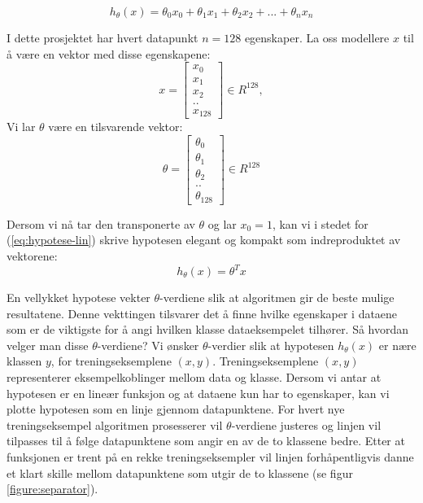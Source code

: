 \begin{equation}
h_\theta(x) = \theta_0x_0 + \theta_1x_1 + \theta_2x_2 + ... + \theta_nx_n
\label{eq:hypotese-lin}
\end{equation}

I dette prosjektet har hvert datapunkt $n = 128$ egenskaper. La oss modellere $x$ til å være en vektor med disse egenskapene: 
\[
x =
\begin{bmatrix}
x_0 \\
x_1 \\
x_2 \\
.. \\
x_{128}
\end{bmatrix}
\in R^{128},
\]
Vi lar $\theta$ være en tilsvarende vektor: 
\[
\theta =
\begin{bmatrix}
\theta_0 \\
\theta_1 \\
\theta_2 \\
.. \\
\theta_{128}
\end{bmatrix}
\in R^{128}
\]

Dersom vi nå tar den transponerte av $\theta$ og lar \(x_0 = 1\), kan vi i stedet for (\ref{eq:hypotese-lin}) skrive hypotesen elegant og kompakt som indreproduktet av vektorene:
\begin{equation}
h_\theta(x) = \theta^{T}x
\label{eq:hypotese-kompakt}
\end{equation}

En vellykket hypotese vekter $\theta$-verdiene slik at algoritmen gir de beste mulige resultatene. Denne vekttingen tilsvarer det å finne hvilke egenskaper i dataene som er de viktigste for å angi hvilken klasse dataeksempelet tilhører. Så hvordan velger man disse $\theta$-verdiene? Vi ønsker $\theta$-verdier slik at hypotesen \(h_\theta(x)\) er nære klassen $y$, for treningseksemplene \((x,y)\). Treningseksemplene  \((x,y)\) representerer eksempelkoblinger mellom data og klasse. Dersom vi antar at hypotesen er en lineær funksjon og at dataene kun har to egenskaper, kan vi plotte hypotesen som en linje gjennom datapunktene. For hvert nye treningseksempel algoritmen prosesserer vil $\theta$-verdiene justeres og linjen vil tilpasses til å følge datapunktene som angir en av de to klassene bedre. Etter at funksjonen er trent på en rekke treningseksempler vil linjen forhåpentligvis danne et klart skille mellom datapunktene som utgir de to klassene (se figur \ref{figure:separator}).

